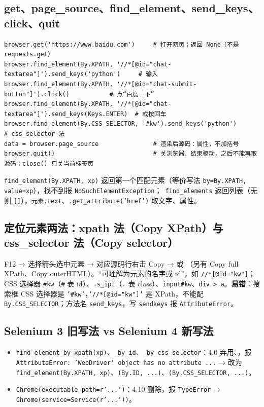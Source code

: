 \subsection{get、page\_source、find\_element、send\_keys、click、quit}
\begin{lstlisting}[style=pyD07]
browser.get('https://www.baidu.com')     # 打开网页；返回 None（不是 requests.get）
browser.find_element(By.XPATH, '//*[@id="chat-textarea"]').send_keys('python')     # 输入
browser.find_element(By.XPATH, '//*[@id="chat-submit-button"]').click()           # 点“百度一下”
browser.find_element(By.XPATH, '//*[@id="chat-textarea"]').send_keys(Keys.ENTER)  # 或按回车
browser.find_element(By.CSS_SELECTOR, '#kw').send_keys('python')                  # css_selector 法
data = browser.page_source               # 渲染后源码：属性，不加括号
browser.quit()                           # 关浏览器、结束驱动，之后不能再取源码；close() 只关当前标签页
\end{lstlisting}
\texttt{find\_element(By.XPATH, xp)} 返回第一个匹配元素（等价写法 \texttt{by=By.XPATH, value=xp}），找不到报 \texttt{NoSuchElementException}；\tagext\ \texttt{find\_elements} 返回列表（无则 \texttt{[]}），\texttt{元素.text}、\texttt{.get\_attribute('href')} 取文字、属性。

\subsection{定位元素两法：xpath 法（Copy XPath）与 css\_selector 法（Copy selector）}
F12 → 选择箭头选中元素 → 对应源码行右击 Copy →  或 （另有 Copy full XPath、Copy outerHTML）。“可理解为元素的名字或 id”，如 \texttt{//*[@id="kw"]}；CSS 选择器 \texttt{\#kw}（\texttt{\#} 表 id）、\texttt{.s\_ipt}（\texttt{.} 表 class）、\texttt{input\#kw}、\texttt{div > a}。\textbf{易错}：搜索框 CSS 选择器是 \texttt{'\#kw'}，\texttt{'//*[@id="kw"]'} 是 XPath，不能配 \texttt{By.CSS\_SELECTOR}；方法名 \texttt{send\_keys}，写 \texttt{sendkeys} 报 \texttt{AttributeError}。

\subsection{Selenium 3 旧写法 vs Selenium 4 新写法}
\begin{itemize}
\item \texttt{find\_element\_by\_xpath(xp)}、\texttt{\_by\_id}、\texttt{\_by\_css\_selector}：4.0 弃用、，报 \texttt{AttributeError: 'WebDriver' object has no attribute ...} → 改为 \texttt{find\_element(By.XPATH, xp)}、\texttt{(By.ID, ...)}、\texttt{(By.CSS\_SELECTOR, ...)}。
\item \texttt{Chrome(executable\_path=r'...')}：4.10 删除，报 \texttt{TypeError} → \texttt{Chrome(service=Service(r'...'))}。
\end{itemize}

